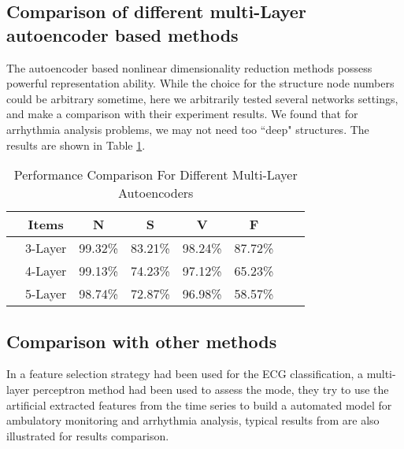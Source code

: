 \documentclass[journal]{IEEEtran}
\begin{document}
  
\subsection{Comparison of different multi-Layer autoencoder based methods}
The autoencoder based nonlinear dimensionality reduction methods possess powerful representation ability.
While the choice for the structure node numbers could be arbitrary sometime, here we arbitrarily tested several networks settings, and make a comparison with their experiment results. We found that for arrhythmia analysis problems, we may not need too ``deep" structures. The results are shown in Table \ref{aeresults}.

  
\begin{table}[!htbp]
\begin{center}
\begin{threeparttable}
\caption{Performance Comparison For Different Multi-Layer Autoencoders}
\label{aeresults}
\begin{tabular}{cccccccc}
\hline
&  Items & N & S & V & F   \\
\hline
&3-Layer  &99.32\% & 83.21\% &98.24\% &  87.72\%  \\
&4-Layer  &99.13\% & 74.23\%  & 97.12\% & 65.23\%       \\
&5-Layer &98.74\% & 72.87\% & 96.98\% &  58.57\% \\
\hline
\end{tabular}
\end{threeparttable}
\end{center}
\end{table}
  
   

\subsection{Comparison with other methods}
In \cite{mar} a feature selection strategy had been used for the ECG classification, a multi-layer perceptron method had been used to assess the mode, they try to use the artificial extracted features from the time series to build a automated model for ambulatory monitoring and arrhythmia analysis, typical results from \cite{chaza, melgan, jiang} are also illustrated for results comparison.
\end{document}
